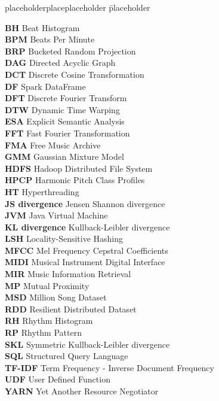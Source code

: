 \documentclass[a4paper,oneside,12pt]{report}
\begin{document}
\begin{tabbing}
placeholderplaceplaceholder \= placeholder \kill

\textbf{BH} \> Beat Histogram\\
\textbf{BPM} \> Beats Per Minute\\
\textbf{BRP} \> Bucketed Random Projection\\
\textbf{DAG} \> Directed Acyclic Graph\\
\textbf{DCT} \> Discrete Cosine Transformation\\
\textbf{DF} \> Spark DataFrame\\
\textbf{DFT} \> Discrete Fourier Transform\\
\textbf{DTW} \> Dynamic Time Warping\\
\textbf{ESA} \> Explicit Semantic Analysis\\
\textbf{FFT} \> Fast Fourier Transformation\\
\textbf{FMA} \> Free Music Archive\\
\textbf{GMM} \> Gaussian Mixture Model\\
\textbf{HDFS} \> Hadoop Distributed File System\\
\textbf{HPCP} \> Harmonic Pitch Class Profiles\\
\textbf{HT} \> Hyperthreading\\
\textbf{JS divergence} \> Jensen Shannon divergence\\
\textbf{JVM} \> Java Virtual Machine\\
\textbf{KL divergence} \> Kullback-Leibler divergence\\
\textbf{LSH} \> Locality-Sensitive Hashing\\
\textbf{MFCC} \> Mel Frequency Cepstral Coefficients\\
\textbf{MIDI} \> Musical Instrument Digital Interface\\
\textbf{MIR} \> Music Information Retrieval\\
\textbf{MP} \> Mutual Proximity\\
\textbf{MSD} \> Million Song Dataset\\
\textbf{RDD} \> Resilient Distributed Dataset\\
\textbf{RH} \> Rhythm Histogram\\
\textbf{RP} \> Rhythm Pattern\\
\textbf{SKL} \> Symmetric Kullback-Leibler divergence\\
\textbf{SQL} \> Structured Query Language\\
\textbf{TF-IDF} \> Term Frequency - Inverse Document Frequency\\
\textbf{UDF} \> User Defined Function\\
\textbf{YARN} \> Yet Another Resource Negotiator\\



\end{tabbing}
\end{document}

